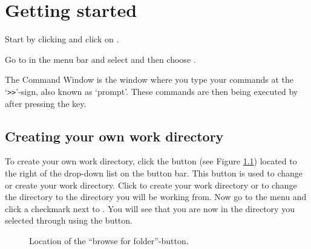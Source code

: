 \chapter{Getting started}
\thispagestyle{fancy}
\label{ch:getting-started}

\begin{action}
Start \MATLAB{} by clicking        and click on .
\end{action}
\begin{action}
Go to  in the menu bar and select  and then choose .
\end{action}

\noindent The Command Window is the window where you type your commands at the `\verb#>>#'-sign, also known as `prompt'. These commands are then being executed by \MATLAB{} after pressing the  key.

\section{Creating your own work directory}



To create your own work directory, click the  button (see Figure \ref{fig:browse-for-folder}) located to the right of the  drop-down list on the \MATLAB{} button bar. This button is used to change or create your work directory. Click to create your work directory or to change the directory to the directory you will be working from. Now go to the  menu and click a checkmark next to . You will see that you are now in the directory you selected through using the  button.

\begin{figure}[!htbp]
  \centering
  \caption{Location of the ``browse for folder''-button.}\label{fig:browse-for-folder}
\end{figure}




